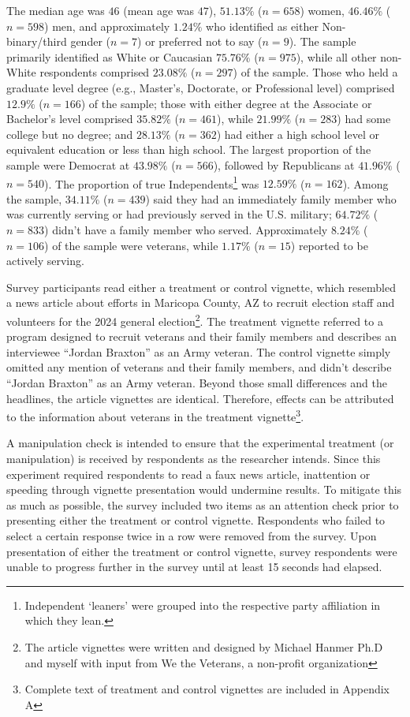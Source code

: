\documentclass[
  12pt,
  letterpaper,
]{article}
\begin{document}
The median age was \(46\) (mean age was \(47\)), \(51.13\%\)
(\(n = 658\)) women, \(46.46\%\) (\(n = 598\)) men, and approximately
\(1.24\%\) who identified as either Non-binary/third gender (\(n = 7\))
or preferred not to say (\(n = 9\)). The sample primarily identified as
White or Caucasian \(75.76\%\) (\(n = 975\)), while all other non-White
respondents comprised \(23.08\%\) (\(n = 297\)) of the sample. Those who
held a graduate level degree (e.g., Master's, Doctorate, or Professional
level) comprised \(12.9\%\) (\(n = 166\)) of the sample; those with
either degree at the Associate or Bachelor's level comprised \(35.82\%\)
(\(n = 461\)), while \(21.99\%\) (\(n = 283\)) had some college but no
degree; and \(28.13\%\) (\(n = 362\)) had either a high school level or
equivalent education or less than high school. The largest proportion of
the sample were Democrat at \(43.98\%\) (\(n = 566\)), followed by
Republicans at \(41.96\%\) (\(n = 540\)). The proportion of true
Independents\footnote{Independent `leaners' were grouped into the
  respective party affiliation in which they lean.} was \(12.59\%\)
(\(n = 162\)). Among the sample, \(34.11\%\) (\(n = 439\)) said they had
an immediately family member who was currently serving or had previously
served in the U.S. military; \(64.72\%\) (\(n = 833\)) didn't have a
family member who served. Approximately \(8.24\%\) (\(n = 106\)) of the
sample were veterans, while \(1.17\%\) (\(n = 15\)) reported to be
actively serving.

Survey participants read either a treatment or control vignette, which
resembled a news article about efforts in Maricopa County, AZ to recruit
election staff and volunteers for the 2024 general election\footnote{The
  article vignettes were written and designed by Michael Hanmer Ph.D and
  myself with input from We the Veterans, a non-profit organization}.
The treatment vignette referred to a program designed to recruit
veterans and their family members and describes an interviewee ``Jordan
Braxton'' as an Army veteran. The control vignette simply omitted any
mention of veterans and their family members, and didn't describe
``Jordan Braxton'' as an Army veteran. Beyond those small differences
and the headlines, the article vignettes are identical. Therefore,
effects can be attributed to the information about veterans in the
treatment vignette\footnote{Complete text of treatment and control
  vignettes are included in Appendix A}.

A manipulation check is intended to ensure that the experimental
treatment (or manipulation) is received by respondents as the researcher
intends. Since this experiment required respondents to read a faux news
article, inattention or speeding through vignette presentation would
undermine results. To mitigate this as much as possible, the survey
included two items as an attention check prior to presenting either the
treatment or control vignette. Respondents who failed to select a
certain response twice in a row were removed from the survey. Upon
presentation of either the treatment or control vignette, survey
respondents were unable to progress further in the survey until at least
15 seconds had elapsed.
\end{document}
